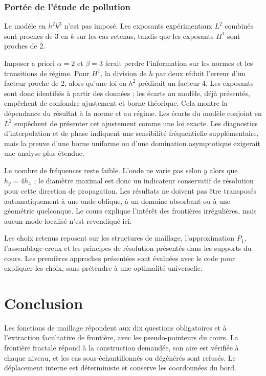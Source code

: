 \documentclass[12pt,a4paper]{article}
\begin{document}
\subsubsection{Portée de l'étude de pollution}
Le modèle en $h^2k^3$ n'est pas imposé. Les exposants expérimentaux $L^2$ combinés sont proches de 3 en $k$ sur les cas retenus, tandis que les exposants $H^1$ sont proches de 2.

Imposer a priori $\alpha=2$ et $\beta=3$ ferait perdre l'information sur les normes et les transitions de régime. Pour $H^1$, la division de $h$ par deux réduit l'erreur d'un facteur proche de 2, alors qu'une loi en $h^2$ prédirait un facteur 4. Les exposants sont donc identifiés à partir des données ; les écarts au modèle, déjà présentés, empêchent de confondre ajustement et borne théorique. Cela montre la dépendance du résultat à la norme et au régime. Les écarts du modèle conjoint en $L^2$ empêchent de présenter cet ajustement comme une loi exacte. Les diagnostics d'interpolation et de phase indiquent une sensibilité fréquentielle supplémentaire, mais la preuve d'une borne uniforme ou d'une domination asymptotique exigerait une analyse plus étendue.

Le nombre de fréquences reste faible. L'onde ne varie pas selon $y$ alors que $h_y=4h_x$ ; le diamètre maximal est donc un indicateur conservatif de résolution pour cette direction de propagation. Les résultats ne doivent pas être transposés automatiquement à une onde oblique, à un domaine absorbant ou à une géométrie quelconque. Le cours \cite{local} explique l'intérêt des frontières irrégulières, mais aucun mode localisé n'est revendiqué ici.

Les choix retenus reposent sur les structures de maillage, l'approximation $P_1$, l'assemblage creux et les principes de résolution présentés dans les supports du cours. Les premières approches présentées sont évaluées avec le code pour expliquer les choix, sans prétendre à une optimalité universelle.

\newpage
\section*{Conclusion}
Les fonctions de maillage répondent aux dix questions obligatoires et à l'extraction facultative de frontière, avec les pseudo-pointeurs du cours. La frontière fractale répond à la construction demandée, son aire est vérifiée à chaque niveau, et les cas sous-échantillonnés ou dégénérés sont refusés. Le déplacement interne est déterministe et conserve les coordonnées du bord.
\end{document}
